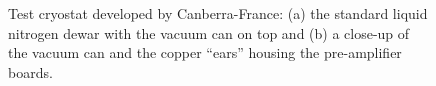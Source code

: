 \begin{figure}[tbhp] 
\centering 
{}\hfil%
%
\caption{Test cryostat developed by Canberra-France: (a) the standard
liquid nitrogen dewar with the vacuum can on top and (b) a close-up of
the vacuum can and the copper ``ears'' housing the pre-amplifier
boards.}
\label{fig:tt:comcryo}
\end{figure}

